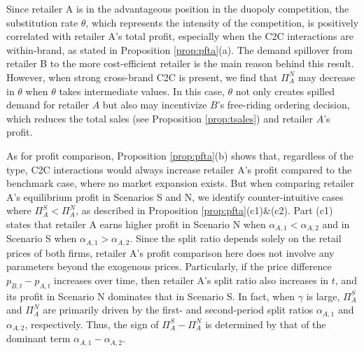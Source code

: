 \documentclass[nonblindrev,copyedit]{informs1}
\begin{document}
Since retailer A is in the advantageous position in the duopoly competition, the substitution rate $\theta$, which represents the intensity of the competition, is positively correlated with retailer A's total profit, especially when the C2C interactions are within-brand, as stated in Proposition \ref{prop:pfta}(a). The demand spillover from retailer B to the more cost-efficient retailer is the main reason behind this result.
However, when strong cross-brand C2C is present, we find that $\Pi^N_{A}$ may decrease in $\theta$ when $\theta$ takes intermediate values. In this case, $\theta$ not only creates spilled demand for retailer $A$ but also may incentivize $B$'s free-riding ordering decision, which reduces the total sales (see Proposition \ref{prop:tsales}) and retailer $A$'s profit.

As for profit comparison, Proposition \ref{prop:pfta}(b) shows that, regardless of the type, C2C interactions would always increase retailer A's profit compared to the benchmark case, where no market expansion exists.
But when comparing retailer A's equilibrium profit in Scenarios S and N, we identify counter-intuitive cases where $\Pi^S_{A} < \Pi^N_{A}$, as described in Proposition \ref{prop:pfta}(c1)\&(c2). Part (c1) states that retailer A earns higher profit in Scenario N when $\alpha_{A,1} < \alpha_{A,2}$ and in Scenario S when $\alpha_{A,1} > \alpha_{A,2}$. Since the split ratio depends solely on the retail prices of both firms, retailer A's profit comparison here does not involve any parameters beyond the exogenous prices. Particularly, if the price difference $p_{B,t} - p_{A,t}$ increases over time, then retailer A's split ratio also increases in $t$, and its profit in Scenario N dominates that in Scenario S. In fact, when $\gamma$ is large, $\Pi^S_{A}$ and $\Pi^N_{A}$ are primarily driven by the first- and second-period split ratios $\alpha_{A,1}$ and $\alpha_{A,2}$, respectively. Thus, the sign of $\Pi^S_{A} - \Pi^N_{A}$ is determined by that of the dominant term $\alpha_{A,1} - \alpha_{A,2}$.
\end{document}
